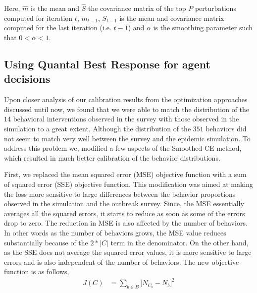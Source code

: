 \documentclass[doublespace,draft]{VTthesis}
\begin{document}
    Here, $\hat{m}$ is the mean and $\hat{S}$ the covariance matrix of the top $P$ perturbations computed for iteration $t$, $m_{t-1}$, $S_{t-1}$ is the mean and covariance matrix computed for the last iteration (i.e. $t-1$) and $\alpha$ is the smoothing parameter such that $0 < \alpha < 1$. 
    
    \subsection{Using Quantal Best Response for agent decisions}
    Upon closer analysis of our calibration results from the optimization approaches discussed until now, we found that we were able to match the distribution of the $14$ behavioral interventions observed in the survey with those observed in the simulation to a great extent. Although the distribution of the $351$ behaviors did not seem to match very well between the survey and the epidemic simulation. To address this problem we, modified a few aspects of the Smoothed-CE method, which resulted in much better calibration of the behavior distributions.
    
    First, we replaced the mean squared error (MSE) objective function with a sum of squared error (SSE) objective function. This modification was aimed at making the loss more sensitive to large differences between the behavior proportions observed in the simulation and the outbreak survey. Since, the MSE essentially averages all the squared errors, it starts to reduce as soon as some of the errors drop to zero. The reduction in MSE is also affected by the number of behaviors. In other words as the number of behaviors grows, the MSE value reduces substantially because of the $2 * |C|$ term in the denominator. On the other hand, as the SSE does not average the squared error values, it is more sensitive to large errors and is also independent of the number of behaviors. The new objective function is as follows,
    \begin{align}
        J(C) &= \sum_{b \in B}\bigg[ N_{C_b} - N_{b} \bigg]^2
    	\label{eqn:objfn3}
    \end{align}
    
\end{document}
